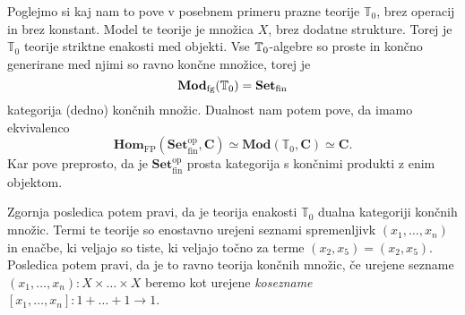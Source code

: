 \documentclass[../kategoricna_logika.tex]{subfiles}
\begin{document}
Poglejmo si kaj nam to pove v posebnem primeru prazne teorije \(\mathbb{T}_0\),
brez operacij in brez konstant. Model te teorije je množica \(X\),
brez dodatne strukture. Torej je \(\mathbb{T}_0\) teorije striktne enakosti
med objekti.
Vse $\mathbb{T}\textsubscript{0}$-algebre so proste in končno generirane med njimi
so ravno končne množice, torej je
\[ \mathbf{Mod}_{\mathrm{fg}}(\mathbb{T}_0) = \mathbf{Set} _{\mathrm{fin}} \]
kategorija (dedno) končnih množic. Dualnost nam potem pove, da
imamo ekvivalenco
\[ \mathbf{Hom}_{\mathrm{FP}}(\mathbf{Set}_{\mathrm{fin}}^{\mathrm{op}}, \mathbf{C}) \simeq
   \mathbf{Mod}(\mathbb{T}_0, \mathbf{C}) \simeq \mathbf{C}. \]
Kar pove preprosto, da je \(\mathbf{Set}_{\mathrm{fin}}^{\mathrm{op}}\)
prosta kategorija s končnimi produkti z enim objektom.

Zgornja posledica potem pravi, da je teorija enakosti \(\mathbb{T}_0\) dualna
kategoriji končnih množic. Termi te teorije so enostavno urejeni seznami
spremenljivk \((x_1, \ldots, x_n)\) in enačbe, ki veljajo so tiste,
ki veljajo točno za terme \((x_2, x_5) = (x_2, x_5)\).
Posledica potem pravi, da je to ravno teorija končnih množic, če
urejene sezname \((x_1, \ldots, x_n) : X \times \ldots \times X\) beremo
kot urejene \emph{kosezname} \([x_1, \ldots, x_n] : 1 + \ldots + 1 \to 1\).
%
%
\end{document}
